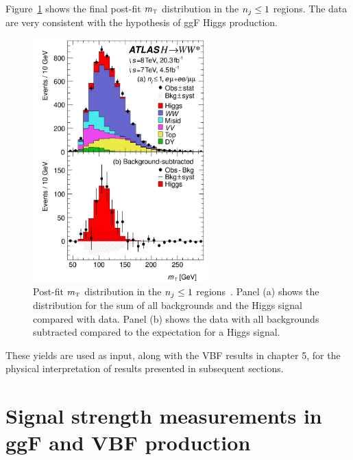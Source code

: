 Figure~\ref{fig:ggF-mT} shows the final post-fit $m_{\textrm{\footnotesize\sc t}}$ distribution in the $n_j \leq 1$ regions. The data are very consistent with the hypothesis of ggF Higgs production. 
%
\begin{figure}[t!]
  \centering
  \captionsetup{justification=centering}

  \includegraphics[width=0.6\textwidth]{figures/ggF_mT}
  \caption{Post-fit $m_{\textrm{\footnotesize\sc t}}$ distribution in the $n_j \leq 1$ regions~\cite{WW2015}. Panel (a) shows the distribution for the sum of all backgrounds and the Higgs signal compared with data. Panel (b) shows the data with all backgrounds subtracted compared to the expectation for a Higgs signal.}
  \label{fig:ggF-mT}
\end{figure}
%
These yields are used as input, along with the VBF results in chapter 5, for the physical interpretation of results presented in subsequent sections. 

\section{Signal strength measurements in ggF and VBF production}

